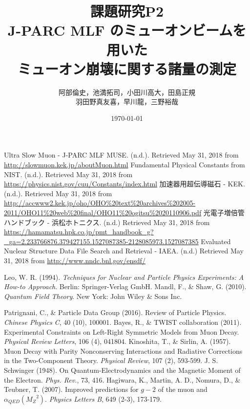 \documentclass[titlepage]{jsarticle}
\begin{document}
\title{課題研究P2\\J-PARC MLF  のミューオンビームを用いた\\ミューオン崩壊に関する諸量の測定}
\author{阿部倫史，池満拓司，小田川高大，田島正規\\羽田野真友喜，早川龍，三野裕哉}
\date{\today}
\maketitle
\tableofcontents
\newpage
%









\newpage
\appendix


\begin{thebibliography}{99}
 Ultra Slow Muon - J-PARC MLF MUSE. (n.d.). Retrieved May 31, 2018
  from \url{http://slowmuon.kek.jp/aboutMuon.html}
 Fundamental Physical Constants from NIST. (n.d.). Retrieved May 31, 2018
  from \url{https://physics.nist.gov/cuu/Constants/index.html}
 加速器用超伝導磁石 - KEK. (n.d.). Retrieved May 31, 2018
  from \url{http://accwww2.kek.jp/oho/OHO\%20text\%20archives\%202005-2011/OHO11\%20web\%20final/OHO11\%20ogitsu\%2020110906.pdf}
 光電子増倍管ハンドブック - 浜松ホトニクス. (n.d.) Retrieved May 31, 2018
  from \url{https://hamamatsu.hpk.co.jp/pmt_handbook_g?\_ga=2.233766876.379427155.1527087385-2128085973.1527087385}
 Evaluated Nuclear Structure Data File Search and Retrieval - IAEA. (n.d.) Retrieved May 31, 2018
  from \url{http://www.nndc.bnl.gov/ensdf/}
  
 Leo, W. R. (1994). \textit{Techniques for Nuclear and Particle Physics Experiments: A How-to Approach}. Berlin: Springer-Verlag GmbH.
 Mandl, F., \& Shaw, G. (2010). \textit{Quantum Field Theory}. New York: John Wiley \& Sons Inc.

 Patrignani, C., \&  Particle Data Group (2016). Review of Particle Physics. \textit{Chinese Physics C}, 40 (10), 100001.
 Bayes, R., \& TWIST collaboration (2011). Experimental Constraints on Left-Right Symmetric Models from Muon Decay. \textit{Physical Review Letters}, 106 (4), 041804.
 Kinoshita, T., \& Sirlin, A. (1957). Muon Decay with Parity Nonconserving Interactions and Radiative Corrections in the Two-Component Theory. \textit{Physical Review}, 107 (2), 593-599.
 J. S. Schwinger (1948). On Quantum-Electrodynamics and the Magnetic Moment of the Electron. \textit{Phys. Rev.}, 73, 416.
 Hagiwara, K., Martin, A. D., Nomura, D., \& Teubner, T. (2007). Improved predictions for $g-2$ of the muon and $\alpha_{QED}({M_Z}^2)$. \textit{Physics Letters B}, 649 (2-3), 173-179.
  
\end{thebibliography} 
\end{document}
